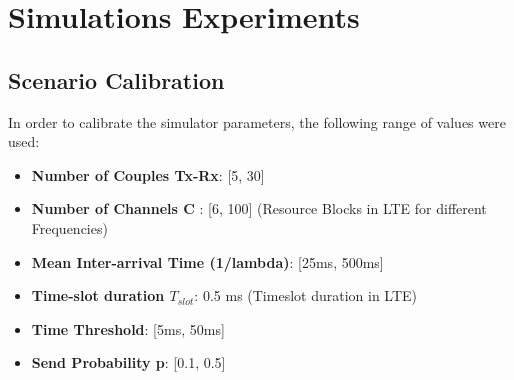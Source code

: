 \section{Simulations Experiments}
\subsection{Scenario Calibration}
In order to calibrate the simulator parameters, the following range of values were used:
\begin{itemize}
	\item \textbf{Number of Couples Tx-Rx}: [5, 30]
	\item \textbf{Number of Channels C} : [6, 100] (Resource Blocks in LTE for different Frequencies)
	\item \textbf{Mean Inter-arrival Time (1/lambda)}: [25ms, 500ms]   
	\item \textbf{Time-slot duration $T_{slot}$}: 0.5 ms (Timeslot duration in LTE)
	\item \textbf{Time Threshold}: [5ms, 50ms] 
	\item \textbf{Send Probability p}: [0.1, 0.5] 
\end{itemize}

